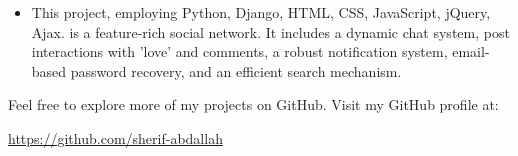 \documentclass[10pt,a4paper,ragged2e,withhyper]{altacv}
\begin{document}
\begin{paracol}{2}
\begin{itemize}
\item This project, employing Python, Django, HTML, CSS, JavaScript, jQuery, Ajax. is a feature-rich social network. It includes a dynamic chat system, post interactions with 'love' and comments, a robust notification system, email-based password recovery, and an efficient search mechanism.


\end{itemize}

\divider






Feel free to explore more of my projects on GitHub. Visit my GitHub profile at:

\begin{center}
    \url{https://github.com/sherif-abdallah}
\end{center}





\switchcolumn




\switchcolumn



\end{paracol}
\end{document}
